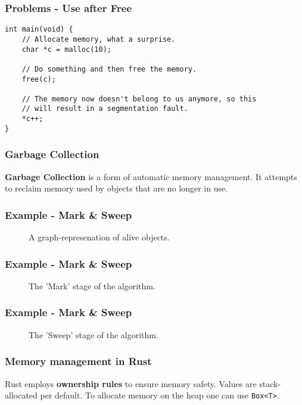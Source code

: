 \documentclass{beamer}
\begin{document}
\begin{frame}[fragile]
	\frametitle{Problems - Use after Free}
	\begin{verbatim}
int main(void) {
	// Allocate memory, what a surprise.
	char *c = malloc(10);

	// Do something and then free the memory.
	free(c);

	// The memory now doesn't belong to us anymore, so this 
	// will result in a segmentation fault.
	*c++;
}
	\end{verbatim}
\end{frame}
\begin{frame}		
	\frametitle{Garbage Collection}
	\textbf{Garbage Collection} is a form of automatic memory management. It attempts to reclaim memory used by objects that are no longer in use.
\end{frame}
\begin{frame}
	\frametitle{Example - Mark \& Sweep}
	\begin{figure}
		\centering
		\def\svgwidth{230pt}
		
		\caption{A graph-represenation of alive objects.}
	\end{figure}
\end{frame}
\begin{frame}
	\frametitle{Example - Mark \& Sweep}
	\begin{figure}
		\centering
		\def\svgwidth{230pt}
		
		\caption{The 'Mark' stage of the algorithm.}
	\end{figure}
\end{frame}
\begin{frame}
	\frametitle{Example - Mark \& Sweep}
	\begin{figure}
		\centering
		\def\svgwidth{230pt}
		
		\caption{The 'Sweep' stage of the algorithm.}
	\end{figure}
\end{frame}
\begin{frame}
	\frametitle{Memory management in Rust}
	Rust employs \textbf{ownership rules} to ensure memory safety.
	Values are stack-allocated per default. To allocate memory on the heap one can use \texttt{Box<T>}.
\end{frame}
\end{document}
